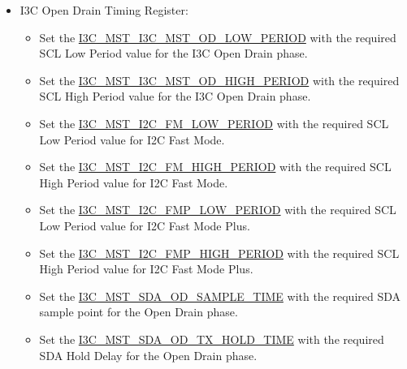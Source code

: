 \documentclass[main\_\_EN.tex]{subfiles}
\begin{document}
\begin{itemize}
\begin{itemize}
\begin{itemize}
              \item Set the \hyperref[fielddesc:I3CMSTREGSCLSTOPSETUPTIME]{I3C\_MST\_SCL\_STOP\_SETUP\_TIME} as required.
              \item Set the \hyperref[fielddesc:I3CMSTREGSTARTDETHOLDTIME]{I3C\_MST\_START\_DET\_HOLD\_TIME} as required.
              \item Set the \hyperref[fielddesc:I3CMSTREGBUSFREETIME]{I3C\_MST\_BUS\_FREE\_TIME} with the required value for the bus free period.
          \end{itemize}
          \item I3C Open Drain Timing Register:
          \begin{itemize}
              \item Set the \hyperref[fielddesc:I3CMSTREGI3CMSTODLOWPERIOD]{I3C\_MST\_I3C\_MST\_OD\_LOW\_PERIOD} with the required SCL Low Period value for the I3C Open Drain phase.
              \item Set the \hyperref[fielddesc:I3CMSTREGI3CMSTODHIGHPERIOD]{I3C\_MST\_I3C\_MST\_OD\_HIGH\_PERIOD} with the required SCL High Period value for the I3C Open Drain phase.
              \item Set the \hyperref[fielddesc:I3CMSTREGI2CFMLOWPERIOD]{I3C\_MST\_I2C\_FM\_LOW\_PERIOD} with the required SCL Low Period value for I2C Fast Mode.
              \item Set the \hyperref[fielddesc:I3CMSTREGI2CFMHIGHPERIOD]{I3C\_MST\_I2C\_FM\_HIGH\_PERIOD} with the required SCL High Period value for I2C Fast Mode.
              \item Set the \hyperref[fielddesc:I3CMSTREGI2CFMPLOWPERIOD]{I3C\_MST\_I2C\_FMP\_LOW\_PERIOD} with the required SCL Low Period value for I2C Fast Mode Plus.
              \item Set the \hyperref[fielddesc:I3CMSTREGI2CFMPHIGHPERIOD]{I3C\_MST\_I2C\_FMP\_HIGH\_PERIOD} with the required SCL High Period value for I2C Fast Mode Plus.
              \item Set the \hyperref[fielddesc:I3CMSTREGSDAODSAMPLETIME]{I3C\_MST\_SDA\_OD\_SAMPLE\_TIME} with the required SDA sample point for the Open Drain phase.
              \item Set the \hyperref[fielddesc:I3CMSTREGSDAODTXHOLDTIME]{I3C\_MST\_SDA\_OD\_TX\_HOLD\_TIME} with the required SDA Hold Delay for the Open Drain phase.
          \end{itemize}


\end{itemize}
\end{itemize}
\end{document}
